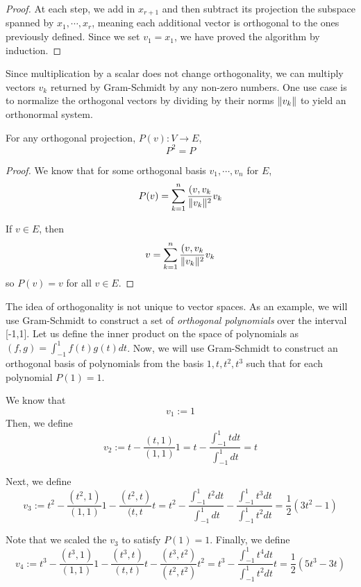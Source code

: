 \begin{proof}
At each step, we add in $x_{r + 1}$ and then subtract its projection the subspace spanned by $x_{1}, \cdots, x_{r}$, meaning each additional vector is orthogonal to the ones previously defined. Since we set $v_{1} = x_{1}$, we have proved the algorithm by induction. 
\end{proof}

Since multiplication by a scalar does not change orthogonality, we can multiply vectors $v_{k}$ returned by Gram-Schmidt by any non-zero numbers. One use case is to normalize the orthogonal vectors by dividing by their norms $\lVert v_{k}\rVert$ to yield an orthonormal system. 

\begin{theorem}
For any orthogonal projection, $P(v): V \rightarrow E$, $$P^{2} = P$$
\end{theorem}

\begin{proof}
We know that for some orthogonal basis $v_{1}, \cdots, v_{n}$ for $E$, 
$$P(v) = \sum_{k=1}^{n} \frac{(v, v_{k}}{\lVert v_{k}\rVert^{2}} v_{k}$$

If $v \in E$, then 
$$v = \sum_{k=1}^{n} \frac{(v, v_{k}}{\lVert v_{k}\rVert^{2}} v_{k}$$
so $P(v) = v$ for all $v \in E$. 
\end{proof}

The idea of orthogonality is not unique to vector spaces. As an example, we will use Gram-Schmidt to construct a set of \textit{orthogonal polynomials} over the interval [-1,1]. Let us define the inner product on the space of polynomials as $(f, g) = \int_{-1}^{1} f(t) g(t) dt$. Now, we will use Gram-Schmidt to construct an orthogonal basis of polynomials from the basis $1, t, t^{2}, t^{3}$ such that for each polynomial $P(1) = 1$.

We know that 
$$v_{1} := 1$$
Then, we define 
$$v_{2} := t - \frac{(t, 1)}{(1, 1)} 1 = t - \frac{\int_{-1}^{1} t dt}{\int_{-1}^{1} dt} = t
$$

Next, we define 
$$v_{3} := t^{2} - \frac{(t^{2}, 1)}{(1, 1)} 1 - \frac{(t^{2}, t)}{(t, t} t = t^{2} - \frac{\int_{-1}^{1} t^{2} dt}{\int_{-1}^{1} dt} - \frac{\int_{-1}^{1} t^{3} dt}{\int_{-1}^{1} t^{2} dt} = \frac{1}{2} (3t^{2} - 1)$$

Note that we scaled the $v_{3}$ to satisfy $P(1) = 1$. Finally, we define 
$$v_{4} := t^{3} - \frac{(t^{3}, 1)}{(1, 1)} 1 - \frac{(t^{3}, t)}{(t, t)} t - \frac{(t^{3}, t^{2})}{(t^{2}, t^{2})} t^{2} = t^{3} - \frac{\int_{-1}^{1} t^{4} dt}{\int_{-1}^{1} t^{2} dt} t = \frac{1}{2} (5t^{3} - 3t)$$

